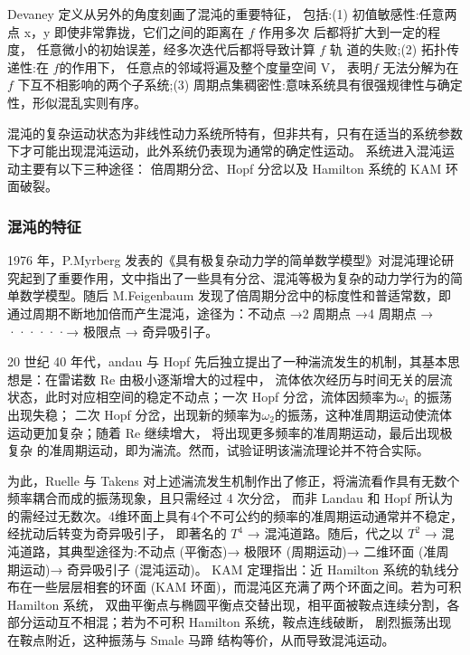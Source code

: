 Devaney 定义从另外的角度刻画了混沌的重要特征， 包括:(1) 初值敏感性:任意两点 x，y 即使非常靠拢，它们之间的距离在 $f$ 作用多次
后都将扩大到一定的程度， 任意微小的初始误差，经多次迭代后都将导致计算 $f$ 轨 道的失败;(2) 拓扑传递性:在 $f $的作用下， 任意点的邻域将遍及整个度量空间 V，
表明$f$ 无法分解为在 $f$ 下互不相影响的两个子系统;(3) 周期点集稠密性:意味系统具有很强规律性与确定性，形似混乱实则有序。\par
混沌的复杂运动状态为非线性动力系统所特有，但非共有，只有在适当的系统参数下才可能出现混沌运动，此外系统仍表现为通常的确定性运动。 系统进入混沌运动主要有以下三种途径：
倍周期分岔、Hopf 分岔以及 Hamilton 系统的 KAM 环面破裂。

\subsubsection{混沌的特征}
1976 年，P.Myrberg 发表的《具有极复杂动力学的简单数学模型》对混沌理论研究起到了重要作用，文中指出了一些具有分岔、混沌等极为复杂的动力学行为的简
单数学模型。随后 M.Feigenbaum 发现了倍周期分岔中的标度性和普适常数，即通过周期不断地加倍而产生混沌，途径为：不动点 →2 周期点 →4 周期点 → ······→ 极限点 → 奇异吸引子。
\par20 世纪 40 年代，andau 与 Hopf 先后独立提出了一种湍流发生的机制，其基本思想是：在雷诺数 Re 由极小逐渐增大的过程中，
流体依次经历与时间无关的层流状态，此时对应相空间的稳定不动点；一次 Hopf 分岔，流体因频率为$\omega_1$ 的振荡出现失稳；
二次 Hopf 分岔，出现新的频率为$\omega_2$的振荡，这种准周期运动使流体运动更加复杂；随着 Re 继续增大，
将出现更多频率的准周期运动，最后出现极复杂 的准周期运动，即为湍流。然而，试验证明该湍流理论并不符合实际。\par
为此，Ruelle 与 Takens 对上述湍流发生机制作出了修正，将湍流看作具有无数个频率耦合而成的振荡现象，且只需经过 4 次分岔，
而非 Landau 和 Hopf 所认为的需经过无数次。4维环面上具有4个不可公约的频率的准周期运动通常并不稳定，经扰动后转变为奇异吸引子，
即著名的 $T^4$ → 混沌道路。随后，代之以 $T^2$ → 混沌道路，其典型途径为:不动点 (平衡态)→ 极限环 (周期运动)→ 二维环面 (准周 期运动)→ 奇异吸引子 (混沌运动)。
KAM 定理指出：近 Hamilton 系统的轨线分布在一些层层相套的环面 (KAM 环面)，而混沌区充满了两个环面之间。若为可积 Hamilton 系统，
双曲平衡点与椭圆平衡点交替出现，相平面被鞍点连续分割，各部分运动互不相混；若为不可积 Hamilton 系统，鞍点连线破断，
剧烈振荡出现在鞍点附近，这种振荡与 Smale 马蹄 结构等价，从而导致混沌运动。
